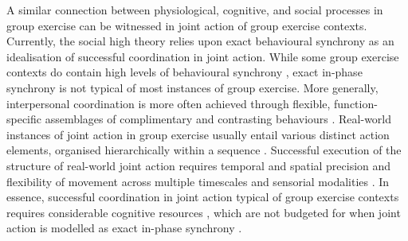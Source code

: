 \begin{CJK}{UTF8}{gbsn}
A similar connection between physiological, cognitive, and social processes in group exercise can be witnessed in joint action of group exercise contexts.  Currently, the social high theory relies upon exact behavioural synchrony as an idealisation of successful coordination in joint action.  While some group exercise contexts do contain high levels of behavioural synchrony \citep[rowing, synchronised swimming, diving, mass calisthenics, and forms of dance such as ballet, see][]{McNeill1995}, exact in-phase synchrony is not typical of most instances of group exercise.  More generally, interpersonal coordination is more often achieved through flexible, function-specific assemblages of complimentary and contrasting behaviours \citep[for example, coordination in an interactional team sport, a dyadic conversation, or an ensemble music performance, see][]{Fusaroli2014}.  Real-world instances of joint action in group exercise usually entail various distinct action elements, organised hierarchically within a sequence \citep{Schmidt1975,Rosenbaum2009}.  Successful execution of the structure of real-world joint action requires temporal and spatial precision and flexibility of movement across multiple timescales and sensorial modalities \citep{Sebanz2006,Pacherie2012}.
In essence, successful coordination in joint action typical of group exercise contexts requires considerable cognitive resources \citep{Turvey1978}, which are not budgeted for when joint action is modelled as exact in-phase synchrony \citep{Keller2014}.



\end{CJK}
